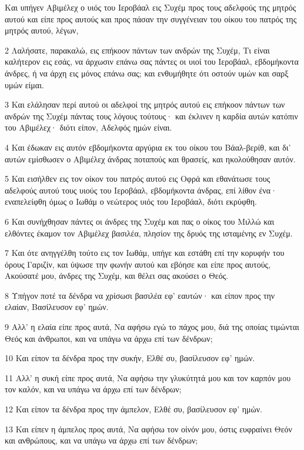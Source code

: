 \par Και υπήγεν Αβιμέλεχ ο υιός του Ιεροβάαλ εις Συχέμ προς τους αδελφούς της μητρός αυτού και είπε προς αυτούς και προς πάσαν την συγγένειαν του οίκου του πατρός της μητρός αυτού, λέγων,
\par 2 Λαλήσατε, παρακαλώ, εις επήκοον πάντων των ανδρών της Συχέμ, Τι είναι καλήτερον εις εσάς, να άρχωσιν επάνω σας πάντες οι υιοί του Ιεροβάαλ, εβδομήκοντα άνδρες, ή να άρχη εις μόνος επάνω σας; και ενθυμήθητε ότι οστούν υμών και σαρξ υμών είμαι.
\par 3 Και ελάλησαν περί αυτού οι αδελφοί της μητρός αυτού εις επήκοον πάντων των ανδρών της Συχέμ πάντας τους λόγους τούτους· και έκλινεν η καρδία αυτών κατόπιν του Αβιμέλεχ· διότι είπον, Αδελφός ημών είναι.
\par 4 Και έδωκαν εις αυτόν εβδομήκοντα αργύρια εκ του οίκου του Βάαλ-βερίθ, και δι' αυτών εμίσθωσεν ο Αβιμέλεχ άνδρας ποταπούς και θρασείς, και ηκολούθησαν αυτόν.
\par 5 Και εισήλθεν εις τον οίκον του πατρός αυτού εις Οφρά και εθανάτωσε τους αδελφούς αυτού τους υιούς του Ιεροβάαλ, εβδομήκοντα άνδρας, επί λίθον ένα· εναπελείφθη όμως ο Ιωθάμ ο νεώτερος υιός του Ιεροβάαλ, διότι εκρύφθη.
\par 6 Και συνήχθησαν πάντες οι άνδρες της Συχέμ και πας ο οίκος του Μιλλώ και ελθόντες έκαμον τον Αβιμέλεχ βασιλέα, πλησίον της δρυός της ισταμένης εν Συχέμ.
\par 7 Και ότε ανηγγέλθη τούτο εις τον Ιωθάμ, υπήγε και εστάθη επί την κορυφήν του όρους Γαριζίν, και ύψωσε την φωνήν αυτού και εβόησε και είπε προς αυτούς, Ακούσατέ μου, άνδρες της Συχέμ, και θέλει σας ακούσει ο Θεός.
\par 8 Υπήγον ποτέ τα δένδρα να χρίσωσι βασιλέα εφ' εαυτών· και είπον προς την ελαίαν, Βασίλευσον εφ' ημών.
\par 9 Αλλ' η ελαία είπε προς αυτά, Να αφήσω εγώ το πάχος μου, διά της οποίας τιμώνται Θεός και άνθρωποι, και να υπάγω να άρχω επί των δένδρων;
\par 10 Και είπον τα δένδρα προς την συκήν, Ελθέ συ, βασίλευσον εφ' ημών.
\par 11 Αλλ' η συκή είπε προς αυτά, Να αφήσω την γλυκύτητά μου και τον καρπόν μου τον καλόν, και να υπάγω να άρχω επί των δένδρων;
\par 12 Και είπον τα δένδρα προς την άμπελον, Ελθέ συ, βασίλευσον εφ' ημών.
\par 13 Και είπεν η άμπελος προς αυτά, Να αφήσω τον οίνόν μου, όστις ευφραίνει Θεόν και ανθρώπους, και να υπάγω να άρχω επί των δένδρων;

